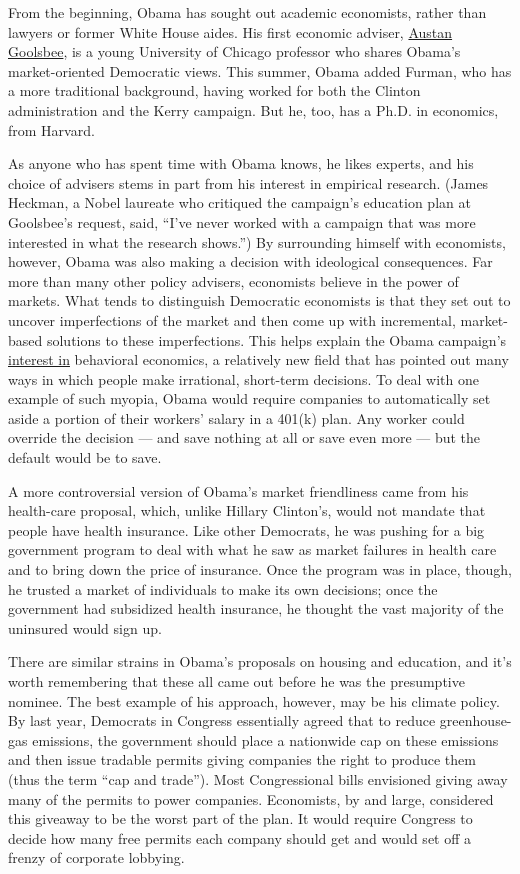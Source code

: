 From the beginning, Obama has sought out academic economists, rather
than lawyers or former White House aides. His first economic adviser,
\href{http://faculty.chicagogsb.edu/austan.goolsbee/website/}{Austan
Goolsbee}, is a young University of Chicago professor who shares Obama's
market-oriented Democratic views. This summer, Obama added Furman, who
has a more traditional background, having worked for both the Clinton
administration and the Kerry campaign. But he, too, has a Ph.D. in
economics, from Harvard.

As anyone who has spent time with Obama knows, he likes experts, and his
choice of advisers stems in part from his interest in empirical
research. (James Heckman, a Nobel laureate who critiqued the campaign's
education plan at Goolsbee's request, said, ``I've never worked with a
campaign that was more interested in what the research shows.'') By
surrounding himself with economists, however, Obama was also making a
decision with ideological consequences. Far more than many other policy
advisers, economists believe in the power of markets. What tends to
distinguish Democratic economists is that they set out to uncover
imperfections of the market and then come up with incremental,
market-based solutions to these imperfections. This helps explain the
Obama campaign's
\href{http://www.nytimes3xbfgragh.onion/2008/01/02/business/02leonhardt.html}{interest
in} behavioral economics, a relatively new field that has pointed out
many ways in which people make irrational, short-term decisions. To deal
with one example of such myopia, Obama would require companies to
automatically set aside a portion of their workers' salary in a 401(k)
plan. Any worker could override the decision --- and save nothing at all
or save even more --- but the default would be to save.

A more controversial version of Obama's market friendliness came from
his health-care proposal, which, unlike Hillary Clinton's, would not
mandate that people have health insurance. Like other Democrats, he was
pushing for a big government program to deal with what he saw as market
failures in health care and to bring down the price of insurance. Once
the program was in place, though, he trusted a market of individuals to
make its own decisions; once the government had subsidized health
insurance, he thought the vast majority of the uninsured would sign up.

There are similar strains in Obama's proposals on housing and education,
and it's worth remembering that these all came out before he was the
presumptive nominee. The best example of his approach, however, may be
his climate policy. By last year, Democrats in Congress essentially
agreed that to reduce greenhouse-gas emissions, the government should
place a nationwide cap on these emissions and then issue tradable
permits giving companies the right to produce them (thus the term ``cap
and trade''). Most Congressional bills envisioned giving away many of
the permits to power companies. Economists, by and large, considered
this giveaway to be the worst part of the plan. It would require
Congress to decide how many free permits each company should get and
would set off a frenzy of corporate lobbying.

